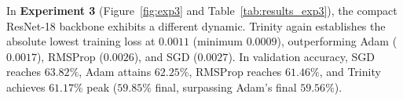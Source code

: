 \documentclass[conference]{IEEEtran}
\begin{document}
In \textbf{Experiment 3} (Figure~\ref{fig:exp3} and Table~\ref{tab:results_exp3}), the compact ResNet-18 backbone exhibits a different dynamic. Trinity again establishes the absolute lowest training loss at $\mathbf{0.0011}$ (minimum $0.0009$), outperforming Adam ($0.0017$), RMSProp ($0.0026$), and SGD ($0.0027$). In validation accuracy, SGD reaches $63.82\%$, Adam attains $62.25\%$, RMSProp reaches $61.46\%$, and Trinity achieves $61.17\%$ peak ($59.85\%$ final, surpassing Adam's final $59.56\%$).


\pgfplotsset{compat=1.18}
\end{document}
